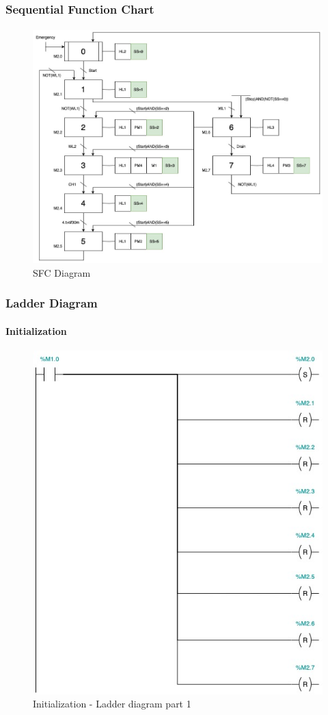 \documentclass[12pt]{beamer}
\begin{document}
\begin{frame}
\frametitle{Sequential Function Chart}
\framesubtitle{}
\begin{figure}
    \centering
    \includegraphics[scale=.24]{img/SFC.jpg}
    \caption{SFC Diagram}
    \label{fig:sfc}
\end{figure}
\end{frame}

\begin{frame}
\frametitle{Ladder Diagram}
\framesubtitle{Initialization}
\begin{figure}
    \centering
    \includegraphics[trim={0 11cm 0 0}, clip, scale=.5]{img/Ladder_diagram_1.jpg}
    \caption{Initialization - Ladder diagram part 1}
    \label{fig:ladder11}
\end{figure}
\end{frame}
\end{document}
